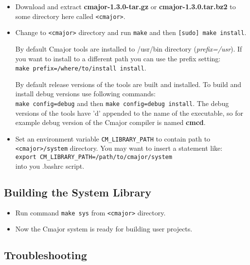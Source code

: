 \documentclass[oneside, a4paper, 11pt]{article}
\begin{document}
\begin{itemize}

\item
Download and extract \textbf{cmajor-1.3.0-tar.gz} or \textbf{cmajor-1.3.0.tar.bz2}
to some directory here called \verb|<cmajor>|.

\item
Change to \verb|<cmajor>| directory and run \verb|make| and then \verb|[sudo] make install|.

By default Cmajor tools are installed to /usr/bin directory (\emph{prefix=/usr}).
If you want to install to a different path you can use the prefix setting:\\
\verb|make prefix=/where/to/install install|.

By default release versions of the tools are built and installed.
To build and install debug versions use following commands:\\
\verb|make config=debug| and then \verb|make config=debug install|.
The debug versions of the tools have 'd' appended to the name of the executable, so
for example debug version of the Cmajor compiler is named \textbf{cmcd}.

\item
Set an environment variable \verb|CM_LIBRARY_PATH| to contain path to \verb|<cmajor>/system| directory.
You may want to insert a statement like:\\
\verb|export CM_LIBRARY_PATH=/path/to/cmajor/system|\\
into you .bashrc script.

\end{itemize}

\subsection{Building the System Library}

\begin{itemize}

\item
Run command \verb|make sys| from \verb|<cmajor>| directory.

\item
Now the Cmajor system is ready for building user projects.

\end{itemize}

\subsection{Troubleshooting}
\end{document}
